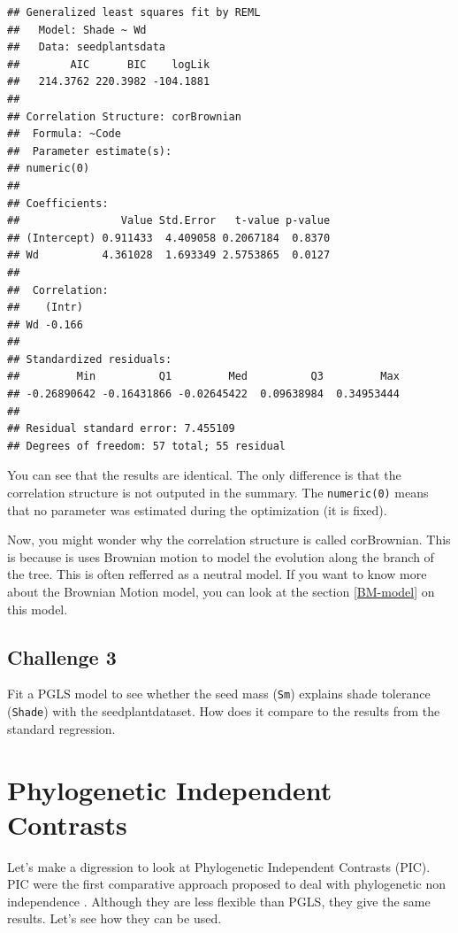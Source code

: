 \documentclass[
]{book}
\begin{document}
\begin{verbatim}
## Generalized least squares fit by REML
##   Model: Shade ~ Wd 
##   Data: seedplantsdata 
##        AIC      BIC    logLik
##   214.3762 220.3982 -104.1881
## 
## Correlation Structure: corBrownian
##  Formula: ~Code 
##  Parameter estimate(s):
## numeric(0)
## 
## Coefficients:
##                Value Std.Error   t-value p-value
## (Intercept) 0.911433  4.409058 0.2067184  0.8370
## Wd          4.361028  1.693349 2.5753865  0.0127
## 
##  Correlation: 
##    (Intr)
## Wd -0.166
## 
## Standardized residuals:
##         Min          Q1         Med          Q3         Max 
## -0.26890642 -0.16431866 -0.02645422  0.09638984  0.34953444 
## 
## Residual standard error: 7.455109 
## Degrees of freedom: 57 total; 55 residual
\end{verbatim}

You can see that the results are identical. The only difference is that the correlation structure is not outputed in the summary. The \texttt{numeric(0)} means that no parameter was estimated during the optimization (it is fixed).

Now, you might wonder why the correlation structure is called corBrownian. This is because is uses Brownian motion to model the evolution along the branch of the tree. This is often refferred as a neutral model. If you want to know more about the Brownian Motion model, you can look at the section \ref{BM-model} on this model.

\section{Challenge 3}\label{challenge-3}

Fit a PGLS model to see whether the seed mass (\texttt{Sm}) explains shade tolerance (\texttt{Shade}) with the seedplantdataset. How does it compare to the results from the standard regression.

\chapter{Phylogenetic Independent Contrasts}\label{pic}

Let's make a digression to look at Phylogenetic Independent Contrasts (PIC). PIC were the first comparative approach proposed to deal with phylogenetic non independence \citep{felsenstein1985phylogenies}. Although they are less flexible than PGLS, they give the same results. Let's see how they can be used.
\end{document}
